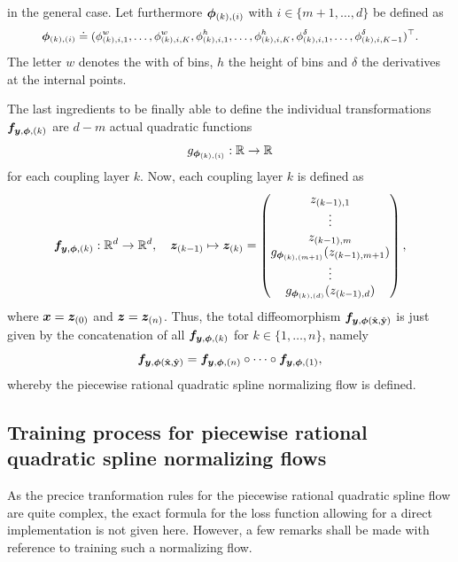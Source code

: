 \documentclass[a4paper,12pt]{report}
\begin{document}
in the general case. Let furthermore $\bm{\phi}_{(k),(i)}$ with $i \in \{m+1,\dots,d\}$ be defined as \begin{align}\small\begin{aligned}
\bm{\phi}_{(k),(i)} \doteq (\phi_{(k),i,1}^w,\dots,\phi_{(k),i,K}^w, \phi_{(k),i,1}^h, \dots, \phi_{(k),i,K}^h, \phi_{(k),i,1}^\delta, \dots,\phi_{(k),i,K-1}^\delta)^\top.
\end{aligned}\end{align} The letter $w$ denotes the with of bins, $h$ the height of bins and $\delta$ the derivatives at the internal points.

The last ingredients to be finally able to define the individual transformations $\bm{f}_{\bm{y},\bm{\phi},(k)}$ are $d-m$ actual quadratic functions \begin{equation}
g_{\bm{\phi}_{(k),(i)}} : \mathbb{R} \rightarrow \mathbb{R}
\end{equation} for each coupling layer $k$. Now, each coupling layer $k$ is defined as \begin{equation}
\bm{f}_{\bm{y},\bm{\phi},(k)} : \mathbb{R}^d \rightarrow \mathbb{R}^d, \quad \bm{z}_{(k-1)} \mapsto \bm{z}_{(k)} = \begin{pmatrix}
z_{(k-1),1} \\
\vdots \\
z_{(k-1),m} \\
g_{\bm{\phi}_{(k),(m+1)}}(z_{(k-1),m+1}) \\
\vdots \\
g_{\bm{\phi}_{(k),(d)}}(z_{(k-1),d})
\end{pmatrix},
\end{equation} where $\bm{x} = \bm{z}_{(0)}$ and $\bm{z} = \bm{z}_{(n)}$. Thus, the total diffeomorphism $\bm{f}_{\bm{y},\bm{\phi}(\hat{\boldsymbol{\mathbf{x}}},\hat{\boldsymbol{\mathbf{y}}})}$ is just given by the concatenation of all $\bm{f}_{\bm{y},\bm{\phi},(k)}$ for $k \in \{1,\dots,n\}$, namely \begin{equation}
\bm{f}_{\bm{y},\bm{\phi}(\hat{\boldsymbol{\mathbf{x}}},\hat{\boldsymbol{\mathbf{y}}})} = \bm{f}_{\bm{y},\bm{\phi},(n)} \circ \dots \circ \bm{f}_{\bm{y},\bm{\phi},(1)},
\end{equation} whereby the piecewise rational quadratic spline normalizing flow is defined.

\subsection{Training process for piecewise rational quadratic spline normalizing flows}
As the precice tranformation rules for the piecewise rational quadratic spline flow are quite complex, the exact formula for the loss function allowing for a direct implementation is not given here. However, a few remarks shall be made with reference to training such a normalizing flow.
\end{document}

